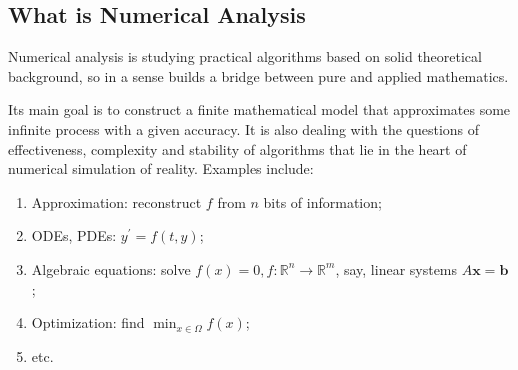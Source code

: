 \subsection{What is Numerical Analysis}

Numerical analysis is studying practical algorithms based on solid theoretical background, so in a sense builds a bridge between pure and applied mathematics.

Its main goal is to construct a finite mathematical model that approximates some infinite process with a given accuracy. It is also dealing with the questions of effectiveness, complexity and stability of algorithms that lie in the heart of numerical simulation of reality. Examples include:

\begin{enumerate}
  \item Approximation: reconstruct $f$ from $n$ bits of information;
  \item ODEs, PDEs: $y^{\prime}=f(t, y)$;
  \item Algebraic equations: solve $f(x)=0, f: \mathbb{R}^{n} \rightarrow \mathbb{R}^{m}$, say, linear systems $A \boldsymbol{x}=\boldsymbol{b}$;
  \item Optimization: find $\min _{x \in \Omega} f(x)$;
  \item etc.
\end{enumerate}